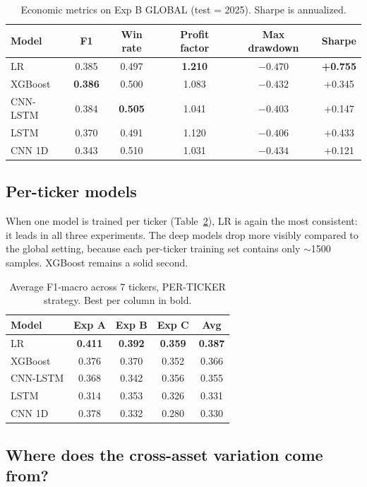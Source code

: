 \documentclass[runningheads]{llncs}
\begin{document}
\begin{table}[htbp]
\centering
\small
\caption{Economic metrics on Exp B GLOBAL (test = 2025). Sharpe is annualized.}
\label{tab:econ_B}
\begin{tabular}{lccccc}
\toprule
Model & F1 & Win rate & Profit factor & Max drawdown & Sharpe \\
\midrule
LR & 0.385 & 0.497 & \textbf{1.210} & $-0.470$ & \textbf{+0.755} \\
XGBoost & \textbf{0.386} & 0.500 & 1.083 & $-0.432$ & +0.345 \\
CNN-LSTM & 0.384 & \textbf{0.505} & 1.041 & \textbf{$-0.403$} & +0.147 \\
LSTM & 0.370 & 0.491 & 1.120 & $-0.406$ & +0.433 \\
CNN 1D & 0.343 & 0.510 & 1.031 & $-0.434$ & +0.121 \\
\bottomrule
\end{tabular}
\end{table}

\subsection{Per-ticker models}

When one model is trained per ticker (Table~\ref{tab:f1_pt}), LR is again the most consistent: it leads in all three experiments. The deep models drop more visibly compared to the global setting, because each per-ticker training set contains only $\sim$1500 samples. XGBoost remains a solid second.

\begin{table}[htbp]
\centering
\caption{Average F1-macro across 7 tickers, PER-TICKER strategy. Best per column in bold.}
\label{tab:f1_pt}
\begin{tabular}{lcccc}
\toprule
Model & Exp A & Exp B & Exp C & Avg \\
\midrule
LR & \textbf{0.411} & \textbf{0.392} & \textbf{0.359} & \textbf{0.387} \\
XGBoost & 0.376 & 0.370 & 0.352 & 0.366 \\
CNN-LSTM & 0.368 & 0.342 & 0.356 & 0.355 \\
LSTM & 0.314 & 0.353 & 0.326 & 0.331 \\
CNN 1D & 0.378 & 0.332 & 0.280 & 0.330 \\
\bottomrule
\end{tabular}
\end{table}

\subsection{Where does the cross-asset variation come from?}
\label{sec:crossasset}
\end{document}
